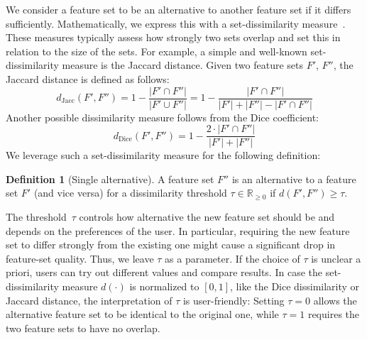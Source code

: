 \documentclass{article}
\theoremstyle{definition}
\newtheorem{definition}{Definition}
\begin{document}
We consider a feature set to be an alternative to another feature set if it differs sufficiently.
Mathematically, we express this with a set-dissimilarity measure~\cite{egghe2009new}.
These measures typically assess how strongly two sets overlap and set this in relation to the size of the sets.
For example, a simple and well-known set-dissimilarity measure is the Jaccard distance.
Given two feature sets $F'$, $F''$, the Jaccard distance is defined as follows:
%
\begin{equation}
	d_{\text{Jacc}}(F',F'') = 1 - \frac{|F' \cap F''|}{|F' \cup F''|} = 1 - \frac{|F' \cap F''|}{|F'| + |F''| - |F' \cap F''|}
	\label{eq:jaccard}
\end{equation}
%
Another possible dissimilarity measure follows from the Dice coefficient:
%
\begin{equation}
	d_{\text{Dice}}(F',F'') = 1 - \frac{2 \cdot |F' \cap F''|}{|F'| + |F''|}
	\label{eq:dice}
\end{equation}
%
We leverage such a set-dissimilarity measure for the following definition:
%
\begin{definition}[Single alternative]
	A feature set $F''$ is an alternative to a feature set $F'$ (and vice versa) for a dissimilarity threshold $\tau \in \mathbb{R}_{\geq 0}$ if $d(F',F'') \geq \tau$.
	\label{def:single-alternative}
\end{definition}
%
The threshold~$\tau$ controls how alternative the new feature set should be and depends on the preferences of the user.
In particular, requiring the new feature set to differ strongly from the existing one might cause a significant drop in feature-set quality.
Thus, we leave $\tau$ as a parameter.
If the choice of $\tau$ is unclear a priori, users can try out different values and compare results.
In case the set-dissimilarity measure $d(\cdot)$ is normalized to $[0,1]$, like the Dice dissimilarity or Jaccard distance, the interpretation of $\tau$ is user-friendly:
Setting $\tau=0$ allows the alternative feature set to be identical to the original one, while $\tau=1$ requires the two feature sets to have no overlap.
\end{document}
